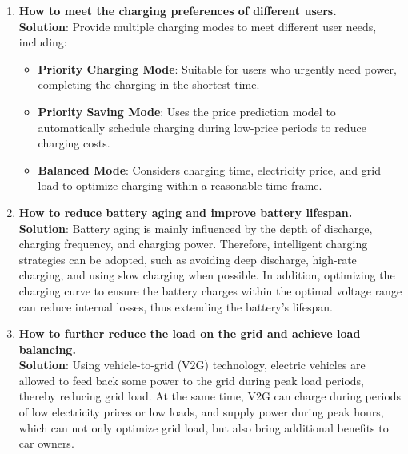 \documentclass[
english,
ruledheaders=section,%
class=report,%
thesis={type=Report},%
accentcolor=9c,%
custommargins=true,%
marginpar=false,%
parskip=half-,%
fontsize=11pt,%
logofile={img/tuda_logo.pdf}, %
]{tudapub}
\begin{document}
\begin{enumerate}
        \item \textbf{How to meet the charging preferences of different users.} \\
        \textbf{Solution}: Provide multiple charging modes to meet different user needs, including:
        \begin{itemize}
            \item \textbf{Priority Charging Mode}: Suitable for users who urgently need power, completing the charging in the shortest time.
            \item \textbf{Priority Saving Mode}: Uses the price prediction model to automatically schedule charging during low-price periods to reduce charging costs.
            \item \textbf{Balanced Mode}: Considers charging time, electricity price, and grid load to optimize charging within a reasonable time frame.
        \end{itemize}



        \item \textbf{How to reduce battery aging and improve battery lifespan.} \\
        \textbf{Solution}: Battery aging is mainly influenced by the depth of discharge, charging frequency, and charging power. Therefore, intelligent charging strategies can be adopted, such as avoiding deep discharge, high-rate charging, and using slow charging when possible. In addition, optimizing the charging curve to ensure the battery charges within the optimal voltage range can reduce internal losses, thus extending the battery's lifespan.



        \item \textbf{How to further reduce the load on the grid and achieve load balancing. } \\
        \textbf{Solution}: Using vehicle-to-grid (V2G) technology, electric vehicles are allowed to feed back some power to the grid during peak load periods, thereby reducing grid load. At the same time, V2G can charge during periods of low electricity prices or low loads, and supply power during peak hours, which can not only optimize grid load, but also bring additional benefits to car owners.


\end{enumerate}
\end{document}

